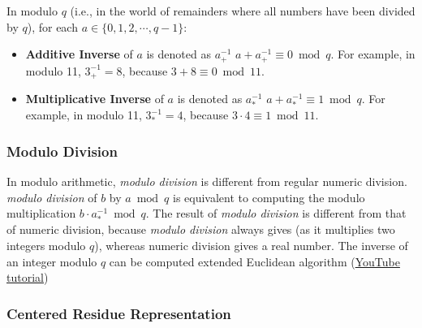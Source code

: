 \begin{tcolorbox}[title={\textbf{\tboxdef{\ref*{subsec:modulo-inverse}} Inverse in Modulo Arithmetic}}]

In modulo $q$ (i.e., in the world of remainders where all numbers have been divided by $q$), for each $a \in \{0, 1, 2, \cdots, q-1\}$:

\begin{itemize}

\item \textbf{Additive Inverse} of $a$ is denoted as $a_+^{-1}$  $a + a_+^{-1} \equiv 0 \bmod q$. For example, in modulo 11, $3_+^{-1} = 8$, because $3 + 8 \equiv 0 \bmod 11$.

\item \textbf{Multiplicative Inverse} of $a$ is denoted as $a_*^{-1}$  $a + a_*^{-1} \equiv 1 \bmod q$. For example, in modulo 11, $3_*^{-1} = 4$, because $3 \cdot 4 \equiv 1 \bmod 11$.

\end{itemize}

\end{tcolorbox}

\subsubsection{Modulo Division}
\label{subsec:modulo-division}

In modulo arithmetic, \textit{modulo division} is different from regular numeric division.  \textit{modulo division} of $b$ by $a \bmod q$ is equivalent to computing the modulo multiplication $b \cdot a_*^{-1} \bmod q$. The result of \textit{modulo division} is different from that of numeric division, because \textit{modulo division} always gives  (as it multiplies two integers modulo $q$), whereas numeric division gives a real number. The inverse of an integer modulo $q$ can be computed  extended Euclidean algorithm (\href{https://www.youtube.com/watch?v=fz1vxq5ts5I}{YouTube tutorial})

\subsubsection{Centered Residue Representation}
\label{subsec:modulo-centered}


